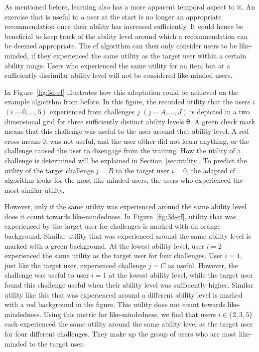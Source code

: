 As mentioned before, learning also has a more apparent temporal aspect to it.
An exercise that is useful to a user at the start is no longer an appropriate recommendation once their ability has increased sufficiently.
It could hence be beneficial to keep track of the ability level around which a recommendation can be deemed appropriate.
The \gls{cf} algorithm can then only consider users to be like-minded, if they experienced the same utility as the target user within a certain ability range.
Users who experienced the same utility for an item but at a sufficiently dissimilar ability level will not be considered like-minded users.

In Figure~\ref{fig:3d-cf} illustrates how this adaptation could be achieved on the example algorithm from before.
In this figure, the recorded utility that the users $i$ $(i = 0,\dots,5)$ experienced from challenges $j$ $(j = A,\dots,J)$ is depicted in a two dimensional grid for three sufficiently distinct ability levels $\bm\theta$.
A green check mark means that this challenge was useful to the user around that ability level.
A red cross means it was not useful, and the user either did not learn anything, or the challenge caused the user to disengage from the training.
How the utility of a challenge is determined will be explained in Section~\ref{sec:utility}.
To predict the utility of the target challenge $j = B$ to the target user $i = 0$, the adapted \gls{cf} algorithm looks for the most like-minded users, the users who experienced the most similar utility.

However, only if the same utility was experienced around the same ability level does it count towards like-mindedness.
In Figure~\ref{fig:3d-cf}, utility that was experienced by the target user for challenges is marked with an orange background.
Similar utility that was experienced around the same ability level is marked with a green background.
At the lowest ability level, user $i = 2$ experienced the same utility as the target user for four challenges.
User $i = 1$, just like the target user, experienced challenge $j = C$ as useful.
However, the challenge was useful to user $i = 1$ at the lowest ability level, while the target user found this challenge useful when their ability level was sufficiently higher.
Similar utility like this that was experienced around a different ability level is marked with a red background in the figure.
This utility does not count towards like-mindedness.
Using this metric for like-mindedness, we find that users $i \in \{2,3,5\}$ each experienced the same utility around the same ability level as the target user for four different challenges.
They make up the group of users who are most like-minded to the target user.

